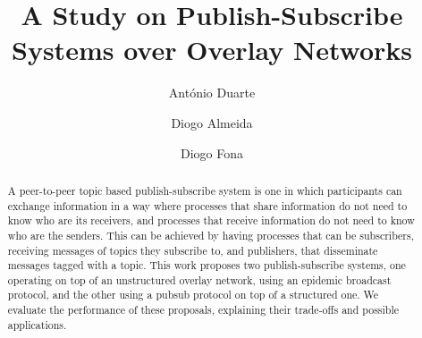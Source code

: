 \documentclass[sigconf]{acmart}
\begin{document}
\title{A Study on Publish-Subscribe Systems over Overlay Networks}

\author{António Duarte}

\author{Diogo Almeida}

\author{Diogo Fona}

\renewcommand{\shortauthors}{Duarte, Almeida, and Fona.}

\begin{abstract}
    A peer-to-peer topic based publish-subscribe system is one in which participants can exchange information in a way where processes that share information do not need to know who are its receivers, and processes that receive information do not need to know who are the senders. This can be achieved by having processes that can be subscribers, receiving messages of topics they subscribe to, and publishers, that disseminate messages tagged with a topic.
    This work proposes two publish-subscribe systems, one operating on top of an unstructured overlay network, using an epidemic broadcast protocol, and the other using a pubsub protocol on top of a structured one. We evaluate the performance of these proposals, explaining their trade-offs and possible applications.
\end{abstract}

\maketitle
\end{document}
